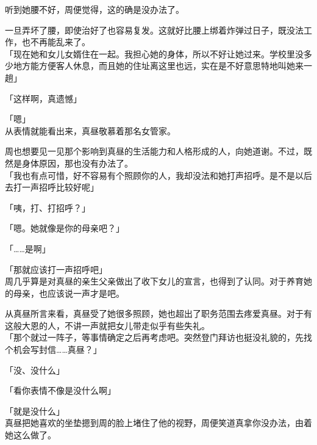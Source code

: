 听到她腰不好，周便觉得，这的确是没办法了。

一旦弄坏了腰，即使治好了也容易复发。这就好比腰上绑着炸弹过日子，既没法工作，也不再能乱来了。\\

「现在她和女儿女婿住在一起。我担心她的身体，所以不好让她过来。学校里没多少地方能方便客人休息，而且她的住址离这里也远，实在是不好意思特地叫她来一趟」

「这样啊，真遗憾」

「嗯」\\

从表情就能看出来，真昼敬慕着那名女管家。

周也想要见一见那个影响到真昼的生活能力和人格形成的人，向她道谢。不过，既然是身体原因，那也没有办法了。\\

「我也有点可惜，好不容易有个照顾你的人，我却没法和她打声招呼。是不是以后去打一声招呼比较好呢」

「咦，打、打招呼？」

「嗯。她就像是你的母亲吧？」

「……是啊」

「那就应该打一声招呼吧」\\

周几乎算是对真昼的亲生父亲做出了收下女儿的宣言，也得到了认同。对于养育她的母亲，也应该说一声才是吧。

从真昼所言来看，真昼受了她很多照顾，她也超出了职务范围去疼爱真昼。对于有这般大恩的人，不讲一声就把女儿带走似乎有些失礼。\\

「那个就过一阵子，等事情确定之后再考虑吧。突然登门拜访也挺没礼貌的，先找个机会写封信……真昼？」

「没、没什么」

「看你表情不像是没什么啊」

「就是没什么」\\

真昼把她喜欢的坐垫摁到周的脸上堵住了他的视野，周便笑道真拿你没办法，由着她这么做了。
